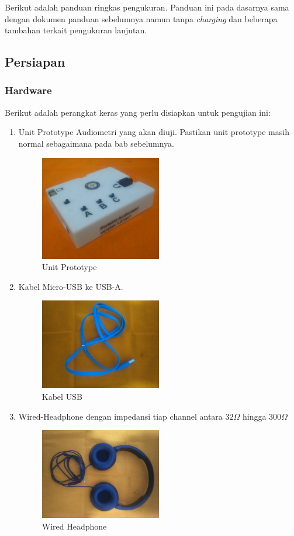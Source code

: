 \documentclass[12pt,]{article}
\begin{document}
	Berikut adalah panduan ringkas pengukuran.
	Panduan ini pada dasarnya sama dengan dokumen panduan sebelumnya namun tanpa \textit{charging} dan beberapa tambahan terkait pengukuran lanjutan.
	
	\subsection{Persiapan}
	
	\subsubsection{Hardware}
	
	Berikut adalah perangkat keras yang perlu disiapkan untuk pengujian ini:
	\begin{enumerate}
		\item Unit Prototype Audiometri yang akan diuji.
		Pastikan unit prototype masih normal sebagaimana pada bab sebelumnya.
		\begin{figure}[!ht]
			\centering
			\includegraphics[width=150pt]{images/foto/unit}
			\caption{Unit Prototype}
		\end{figure}
		
		\item Kabel Micro-USB ke USB-A.
		\begin{figure}[!ht]
			\centering
			\includegraphics[width=150pt]{images/foto/kabel}
			\caption{Kabel USB}
		\end{figure}
		
		\item Wired-Headphone dengan impedansi tiap channel antara $32\Omega$ hingga $300\Omega$
		\begin{figure}[!ht]
			\centering
			\includegraphics[width=150pt]{images/foto/phone}
			\caption{Wired Headphone}
		\end{figure}
		

\end{enumerate}
\end{document}
